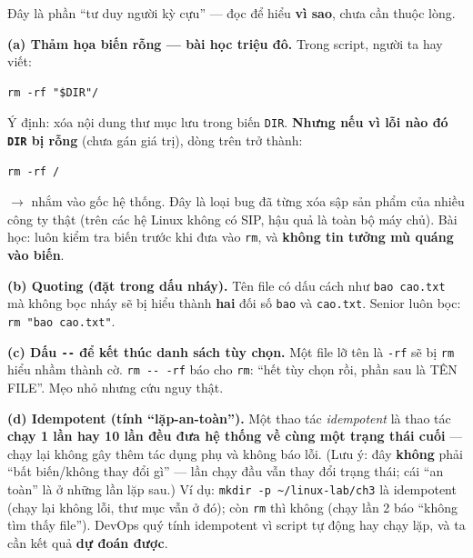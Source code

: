 \documentclass[12pt,a4paper]{article}
\newcommand{\cmd}[1]{\texttt{#1}}
\begin{document}
\begin{seniorbox}[title={Góc Senior \#4 --- quoting, \texttt{-{}-}, idempotent, alias an toàn, và vì sao ``biến rỗng'' giết cả hệ thống}]
Đây là phần ``tư duy người kỳ cựu'' --- đọc để hiểu \textbf{vì sao}, chưa cần thuộc lòng.

\vspace{0.5em}
\textbf{(a) Thảm họa biến rỗng --- bài học triệu đô.} Trong script, người ta hay viết:
\begin{Verbatim}
rm -rf "$DIR"/
\end{Verbatim}
Ý định: xóa nội dung thư mục lưu trong biến \cmd{DIR}. \textbf{Nhưng nếu vì lỗi nào đó \cmd{DIR} bị rỗng} (chưa gán giá trị), dòng trên trở thành:
\begin{Verbatim}
rm -rf /
\end{Verbatim}
$\rightarrow$ nhắm vào gốc hệ thống. Đây là loại bug đã từng xóa sập sản phẩm của nhiều công ty thật (trên các hệ Linux không có SIP, hậu quả là toàn bộ máy chủ). Bài học: luôn kiểm tra biến trước khi đưa vào \cmd{rm}, và \textbf{không tin tưởng mù quáng vào biến}.

\vspace{0.5em}
\textbf{(b) Quoting (đặt trong dấu nháy).} Tên file có dấu cách như \cmd{bao cao.txt} mà không bọc nháy sẽ bị hiểu thành \textbf{hai} đối số \cmd{bao} và \cmd{cao.txt}. Senior luôn bọc: \cmd{rm "bao cao.txt"}.

\vspace{0.5em}
\textbf{(c) Dấu \cmd{-{}-} để kết thúc danh sách tùy chọn.} Một file lỡ tên là \cmd{-rf} sẽ bị \cmd{rm} hiểu nhầm thành cờ. \cmd{rm -{}- -rf} báo cho \cmd{rm}: ``hết tùy chọn rồi, phần sau là TÊN FILE''. Mẹo nhỏ nhưng cứu nguy thật.

\vspace{0.5em}
\textbf{(d) Idempotent (tính ``lặp-an-toàn'').} Một thao tác \textit{idempotent} là thao tác \textbf{chạy 1 lần hay 10 lần đều đưa hệ thống về cùng một trạng thái cuối} --- chạy lại không gây thêm tác dụng phụ và không báo lỗi. (Lưu ý: đây \textbf{không} phải ``bất biến/không thay đổi gì'' --- lần chạy đầu vẫn thay đổi trạng thái; cái ``an toàn'' là ở những lần lặp sau.) Ví dụ: \cmd{mkdir -p \textasciitilde/linux-lab/ch3} là idempotent (chạy lại không lỗi, thư mục vẫn ở đó); còn \cmd{rm} thì không (chạy lần 2 báo ``không tìm thấy file''). DevOps quý tính idempotent vì script tự động hay chạy lặp, và ta cần kết quả \textbf{dự đoán được}.


\end{seniorbox}
\end{document}
